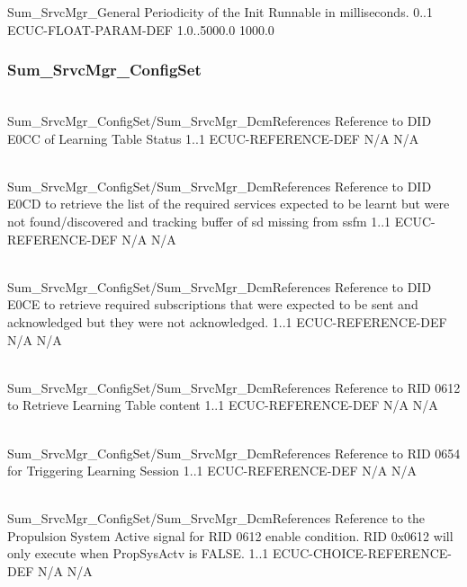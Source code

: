{Sum_SrvcMgr_General}
{Periodicity of the Init Runnable in milliseconds.}
{0..1}
{ECUC-FLOAT-PARAM-DEF}
{1.0..5000.0}
{1000.0}


\subsubsection{Sum_SrvcMgr_ConfigSet}

\\
{Sum_SrvcMgr_ConfigSet/Sum_SrvcMgr_DcmReferences}
{Reference to DID E0CC of Learning Table Status}
{1..1}
{ECUC-REFERENCE-DEF}
{N/A}
{N/A}
{}

\\
{Sum_SrvcMgr_ConfigSet/Sum_SrvcMgr_DcmReferences}
{Reference to DID E0CD to retrieve the list of the required services expected to be learnt but were not found/discovered and tracking buffer of sd missing from ssfm}
{1..1}
{ECUC-REFERENCE-DEF}
{N/A}
{N/A}
{ }

\\
{Sum_SrvcMgr_ConfigSet/Sum_SrvcMgr_DcmReferences}
{Reference to DID E0CE to retrieve required subscriptions that were expected to be sent and acknowledged but they were not acknowledged.}
{1..1}
{ECUC-REFERENCE-DEF}
{N/A}
{N/A}
{}

\\
{Sum_SrvcMgr_ConfigSet/Sum_SrvcMgr_DcmReferences}
{Reference to RID 0612 to Retrieve Learning Table content}
{1..1}
{ECUC-REFERENCE-DEF}
{N/A}
{N/A}
{}

\\
{Sum_SrvcMgr_ConfigSet/Sum_SrvcMgr_DcmReferences}
{Reference to RID 0654 for Triggering Learning Session}
{1..1}
{ECUC-REFERENCE-DEF}
{N/A}
{N/A}
{}

\\
{Sum_SrvcMgr_ConfigSet/Sum_SrvcMgr_DcmReferences}
{Reference to the Propulsion System Active signal for RID 0612 enable condition. RID 0x0612 will only execute when PropSysActv is FALSE.}
{1..1}
{ECUC-CHOICE-REFERENCE-DEF}
{N/A}
{N/A}


